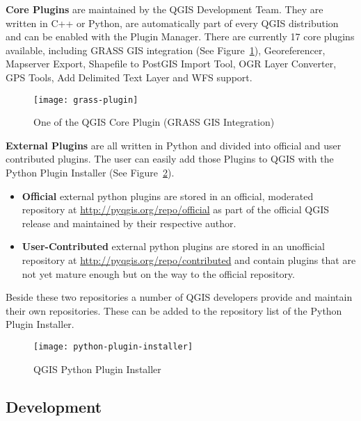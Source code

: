\textbf{Core Plugins} are maintained by the QGIS Development Team. They are
written in C++ or Python, are automatically part of every QGIS distribution
and can be enabled with the Plugin Manager. There are currently 17 core
plugins available, including GRASS GIS integration (See
Figure~\ref{fig:grass-plugin}), Georeferencer, Mapserver Export, Shapefile to
PostGIS Import Tool, OGR Layer Converter, GPS Tools, Add Delimited Text Layer
and WFS support.

\begin{figure}[h]
   \begin{center}
   \caption{One of the QGIS Core Plugin (GRASS GIS Integration)}
    \label{fig:grass-plugin}\smallskip
   \texttt{[image: grass-plugin]}
\end{center}
\end{figure}

\textbf{External Plugins} are all written in Python and divided into official
and user contributed plugins. The user can easily add those Plugins to QGIS
with the Python Plugin Installer (See Figure~\ref{fig:python-plugin}).

\begin{itemize}
\item \textbf{Official} external python plugins are stored in an official,
moderated repository at \url{http://pyqgis.org/repo/official} as part of the
official QGIS release and maintained by their respective author.
\item \textbf{User-Contributed} external python plugins are stored in an
unofficial repository at \url{http://pyqgis.org/repo/contributed} and contain
plugins that are not yet mature enough but on the way to the official
repository.
\end{itemize}

Beside these two repositories a number of QGIS developers provide and maintain
their own repositories. These can be added to the repository list of the
Python Plugin Installer.

\begin{figure}[h]
   \begin{center}
   \caption{QGIS Python Plugin Installer}\label{fig:python-plugin}\smallskip
   \texttt{[image: python-plugin-installer]}
\end{center}
\end{figure}

\subsection{Development}

